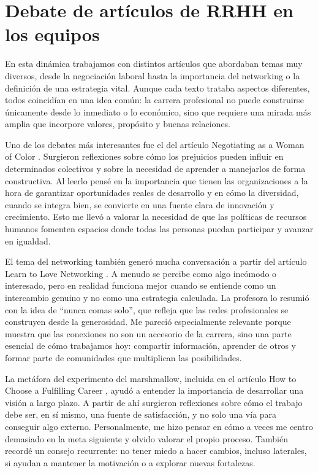 \chapter{Debate de artículos de RRHH en los equipos}

En esta dinámica trabajamos con distintos artículos que abordaban temas muy diversos, desde la negociación laboral hasta la importancia del networking o la definición de una estrategia vital. Aunque cada texto trataba aspectos diferentes, todos coincidían en una idea común: la carrera profesional no puede construirse únicamente desde lo inmediato o lo económico, sino que requiere una mirada más amplia que incorpore valores, propósito y buenas relaciones.

Uno de los debates más interesantes fue el del artículo Negotiating as a Woman of Color \cite{hbr-woc-negotiation}. Surgieron reflexiones sobre cómo los prejuicios pueden influir en determinados colectivos y sobre la necesidad de aprender a manejarlos de forma constructiva. Al leerlo pensé en la importancia que tienen las organizaciones a la hora de garantizar oportunidades reales de desarrollo y en cómo la diversidad, cuando se integra bien, se convierte en una fuente clara de innovación y crecimiento. Esto me llevó a valorar la necesidad de que las políticas de recursos humanos fomenten espacios donde todas las personas puedan participar y avanzar en igualdad.

El tema del networking también generó mucha conversación a partir del artículo Learn to Love Networking \cite{hbr-networking}. A menudo se percibe como algo incómodo o interesado, pero en realidad funciona mejor cuando se entiende como un intercambio genuino y no como una estrategia calculada. La profesora lo resumió con la idea de “nunca comas solo”, que refleja que las redes profesionales se construyen desde la generosidad. Me pareció especialmente relevante porque muestra que las conexiones no son un accesorio de la carrera, sino una parte esencial de cómo trabajamos hoy: compartir información, aprender de otros y formar parte de comunidades que multiplican las posibilidades.

La metáfora del experimento del marshmallow, incluida en el artículo How to Choose a Fulfilling Career \cite{atlantic-fulfilling-career}, ayudó a entender la importancia de desarrollar una visión a largo plazo. A partir de ahí surgieron reflexiones sobre cómo el trabajo debe ser, en sí mismo, una fuente de satisfacción, y no solo una vía para conseguir algo externo. Personalmente, me hizo pensar en cómo a veces me centro demasiado en la meta siguiente y olvido valorar el propio proceso. También recordé un consejo recurrente: no tener miedo a hacer cambios, incluso laterales, si ayudan a mantener la motivación o a explorar nuevas fortalezas.

